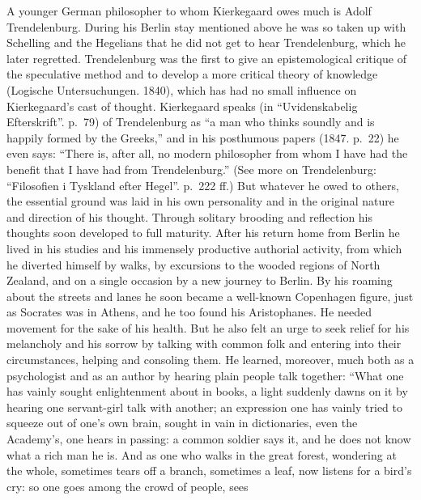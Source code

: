 \documentclass[12pt,a4paper]{book}
\newcommand{\opage}[1]{\marginnote{\footnotesize\textit{[#1]}}}
\begin{document}
A younger German philosopher to whom Kierkegaard owes much is Adolf
Trendelenburg. During his Berlin stay mentioned above he was so taken up
with Schelling and the Hegelians that he did not get to hear
Trendelenburg, which he later regretted. Trendelenburg was the first to
give an epistemological critique of the speculative method and to
develop a more critical theory of knowledge (Logische Untersuchungen.
1840), which has had no small influence on Kierkegaard's cast of
thought. Kierkegaard speaks (in ``Uvidenskabelig Efterskrift''. p.~79)
of Trendelenburg as ``a man who thinks soundly and is happily formed by
the Greeks,'' and in his posthumous papers (1847. p.~22) he even says:
``There is, after all, no modern philosopher from whom I have had the
benefit that I have had from Trendelenburg.'' (See more on Trendelenburg:
``Filosofien i Tyskland efter Hegel''. p.~222 ff.)
\opage{57}But whatever he owed to others, the essential ground was laid in his
own personality and in the original nature and direction of his thought.
Through solitary brooding and reflection his thoughts soon developed to
full maturity. After his return home from Berlin he lived in his studies
and his immensely productive authorial activity, from which he diverted
himself by walks, by excursions to the wooded regions of North Zealand,
and on a single occasion by a new journey to Berlin. By his roaming about
the streets and lanes he soon became a well-known Copenhagen figure, just
as Socrates was in Athens, and he too found his Aristophanes. He needed
movement for the sake of his health. But he also felt an urge to seek
relief for his melancholy and his sorrow by talking with common folk and
entering into their circumstances, helping and consoling them. He
learned, moreover, much both as a psychologist and as an author by
hearing plain people talk together: ``What one has vainly sought
enlightenment about in books, a light suddenly dawns on it by hearing one
servant-girl talk with another; an expression one has vainly tried to
squeeze out of one's own brain, sought in vain in dictionaries, even the
Academy's, one hears in passing: a common soldier says it, and he does
not know what a rich man he is. And as one who walks in the great forest,
wondering at the whole, sometimes tears off a branch, sometimes a leaf,
now listens for a bird's cry: so one goes among the crowd of people, sees
\end{document}
